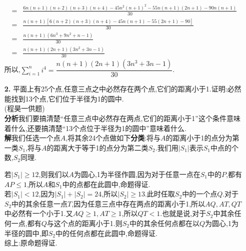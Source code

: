 \documentclass[UTF8]{ctexart}
\begin{document}
\begin{itemize}
\begin{align*}
=&\frac{6n(n+1)(n+2)(n+3)(n+4)-45n^2(n+1)^2-55n(n+1)(2n+1)-90n(n+1)}{30}\\
=&\frac{n(n+1)[6(n+2)(n+3)(n+4)-45n(n+1)-55(2n+1)-90]}{30}\\
=&\frac{n(n+1)(6n^3+9n^2+n-1)}{30}\\
=&\frac{n(n+1)(2n+1)(3n^2+3n-1)}{30}
\end{align*}
\hspace*{2em}所以,$\sum\limits_{i=1}^{n}i^4=\dfrac{n(n+1)(2n+1)(3n^3+3n-1)}{30}$.
\item[\textbf{2.}]{平面上有25个点,任意三点之中必然存在两个点,它们的距离小于1.证明:必然能找到13个点,它们位于半径为1的圆中.\\
(程昊一供题)}\\
\hspace*{2em}\textbf{分析}\quad 我们要搞清楚“任意三点中必然存在两点,它们的距离小于1”这个条件意味着什么,还要搞清楚“13个点位于半径为1的圆中”意味着什么.\\
\hspace*{2em}\textbf{解}\quad 我们任选一个点$A$,将其余24个点做如下\textbf{分类}:将与$A$的距离小于1的点分为第一类$S_1$,将与$A$的距离大于等于1的点分为第二类$S_2$.我们用$|S_1|$表示$S_1$中点的个数,$S_2$同理.\\
\begin{figure}[!ht]
\centering
{}
\end{figure}

\hspace*{2em}若$|S_1|\ge12$,则我们以$A$为圆心,1为半径作圆,因为对于任意一点在$S_1$中的$P$,都有$AP\le1$,所以$A$和$S_1$中的点都在此圆中,命题得证.\\
\hspace*{2em}若$|S_1|<12$,因为$|S_1|+|S_2|=24$,所以$|S_2|\ge13$.此时任取$S_2$中的一个点$Q$.对于$S_2$中的其余任意一点$T$,因为任意三点中存在两点的距离小于1,所以$AQ,AT,QT$中必然有一个小于1.又$AQ\ge1,AT\ge1$,所以$QT<1$.也就是说,对于$S_2$中其余任何一点,都有$Q$与这个点的距离小于1.则$S_2$中的其余任何点都在以$Q$为圆心,1为半径的圆中,即$S_2$中的任何点都在此圆中,命题得证.\\
\hspace*{2em}综上:原命题得证.


\end{itemize}
\end{document}
